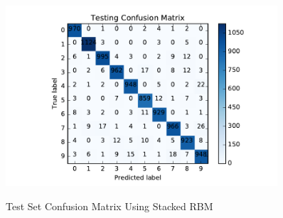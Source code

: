 \begin{figure}[H]
\centering
\includegraphics[width=0.9\textwidth]{./figures/test_stacking.pdf}\
\caption{\label{fig:test_stack} Test Set Confusion Matrix Using Stacked RBM}
\end{figure}


\clearpage
%
%
%



